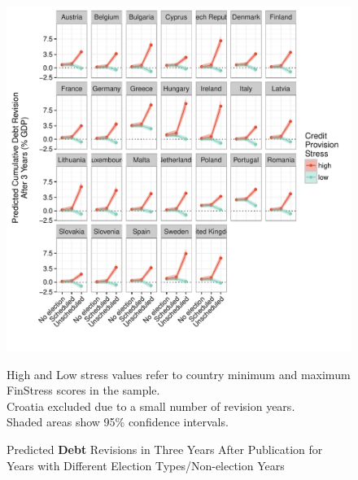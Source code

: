 \documentclass[]{article}
\begin{document}
\begin{figure}
	\caption{Predicted \textbf{Debt} Revisions in Three Years After Publication for Years with Different Election Types/Non-election Years}
    \label{country_predict_debt_required}
    \begin{center}
    	\includegraphics[scale=0.8]{figures/country_predict_required.pdf}
    \end{center}

	{\scriptsize{High and Low stress values refer to country minimum and maximum FinStress scores in the sample.\\
    Croatia excluded due to a small number of revision years.\\
    Shaded areas show 95\% confidence intervals.
}}

\end{figure}
\end{document}
